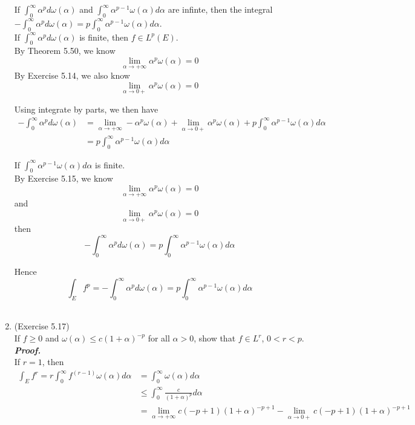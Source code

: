 \documentclass[a4paper,11pt]{article}
\begin{document}
\begin{enumerate}
 If $\int_0^\infty \alpha^p d \omega(\alpha)$ and $\int_0^\infty \alpha^{p-1} \omega(\alpha) d \alpha$ are infinte, then the integral $-\int_0^\infty \alpha^p d \omega(\alpha) = p \int_0^\infty \alpha^{p-1} \omega(\alpha) d \alpha$.\\

 If $\int_0^\infty \alpha^p d \omega(\alpha)$ is finite, then $f \in L^p(E)$.\\

 By Theorem 5.50, we know
 $$\underset{\alpha \to +\infty}{\lim} \alpha^p \omega(\alpha) = 0$$
 By Exercise 5.14, we also know
 $$\underset{\alpha \to 0+}{\lim} \alpha^p \omega(\alpha) = 0$$

 Using integrate by parts, we then have
 $$\begin{aligned}
 - \int_0^\infty \alpha^p d \omega(\alpha)
 &= \underset{\alpha \to +\infty}{\lim} - \alpha^p \omega(\alpha)
 + \underset{\alpha \to 0+}{\lim} \alpha^p \omega(\alpha)
 + p \int_0^\infty \alpha^{p-1} \omega(\alpha) d \alpha\\
 &= p \int_0^\infty \alpha^{p-1} \omega(\alpha) d \alpha
 \end{aligned}$$

 If $\int_0^\infty \alpha^{p-1} \omega(\alpha) d \alpha$ is finite.\\
 By Exercise 5.15, we know 
 $$\underset{\alpha \to +\infty}{\lim} \alpha^p \omega(\alpha) = 0$$
 and
 $$\underset{\alpha \to 0+}{\lim} \alpha^p \omega(\alpha) = 0$$
 then 
 $$- \int_0^\infty \alpha^p d \omega(\alpha)
 = p \int_0^\infty \alpha^{p-1} \omega(\alpha) d \alpha$$

 Hence
 $$\int_E f^p = - \int_0^\infty \alpha^p d \omega(\alpha) = p \int_0^\infty \alpha^{p-1} \omega(\alpha) d \alpha$$\\





\item (Exercise 5.17)\\
 If $f \geq 0$ and $\omega(\alpha) \leq c(1 + \alpha)^{-p}$ for all $\alpha > 0$, show that $f \in L^r$, $0 < r < p$.\\
 \newline
 \textit{\textbf {Proof.}}\\

 If $r = 1$, then
 $$\begin{aligned}
 \int_E f^r
 = r \int_0^\infty f^{(r-1)} \omega (\alpha) d \alpha
 &= \int_0^\infty \omega(\alpha) d\alpha\\
 &\leq \int_0^\infty \frac{c}{(1+\alpha)^p} d \alpha\\
 &= \underset{\alpha \to +\infty}{\lim} c(-p+1)(1+\alpha)^{-p+1}
 - \underset{\alpha \to 0+}{\lim} c(-p+1)(1+\alpha)^{-p+1}
 \end{aligned}$$


\end{enumerate}
\end{document}
